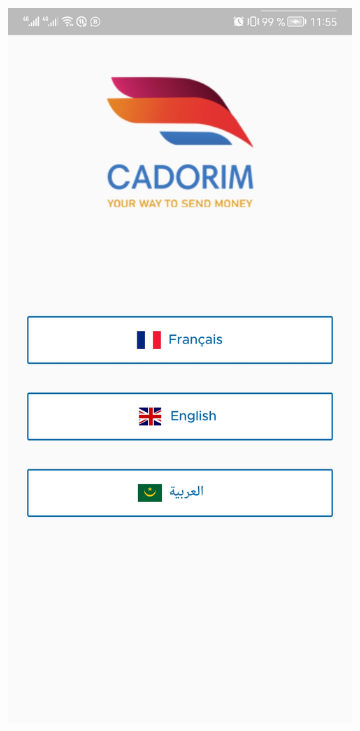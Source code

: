 \begin{figure}[!ht]
	\centering
	\begin{subfigure}{0.3\textwidth}
		\includegraphics[width=\hsize, valign=m]{./Template LaTeX/Images/1.jpg}

\end{subfigure}
\end{figure}
